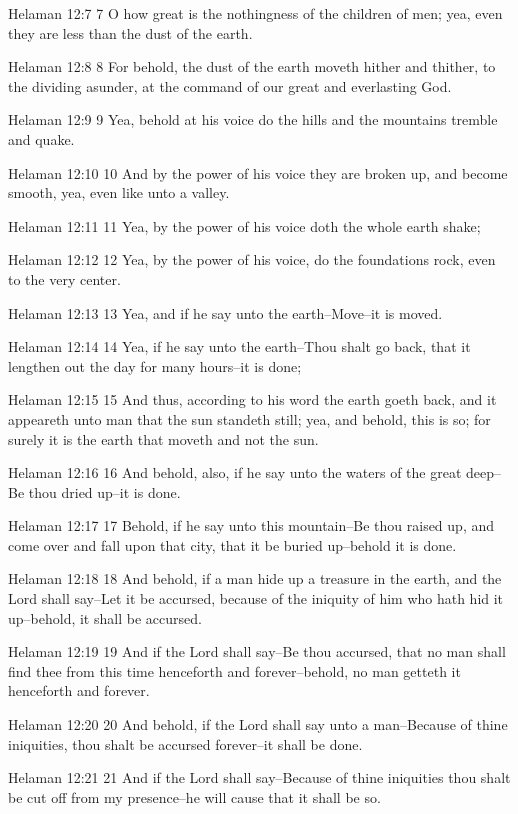 Helaman 12:7
 7 O how great is the nothingness of the children of men; yea,
even they are less than the dust of the earth.

Helaman 12:8
 8 For behold, the dust of the earth moveth hither and thither,
to the dividing asunder, at the command of our great and
everlasting God.

Helaman 12:9
 9 Yea, behold at his voice do the hills and the mountains
tremble and quake.

Helaman 12:10
 10 And by the power of his voice they are broken up, and become
smooth, yea, even like unto a valley.

Helaman 12:11
 11 Yea, by the power of his voice doth the whole earth shake;

Helaman 12:12
 12 Yea, by the power of his voice, do the foundations rock, even
to the very center.

Helaman 12:13
 13 Yea, and if he say unto the earth--Move--it is moved.

Helaman 12:14
 14 Yea, if he say unto the earth--Thou shalt go back, that it
lengthen out the day for many hours--it is done;

Helaman 12:15
 15 And thus, according to his word the earth goeth back, and it
appeareth unto man that the sun standeth still; yea, and behold,
this is so; for surely it is the earth that moveth and not the
sun.

Helaman 12:16
 16 And behold, also, if he say unto the waters of the great
deep--Be thou dried up--it is done.

Helaman 12:17
 17 Behold, if he say unto this mountain--Be thou raised up, and
come over and fall upon that city, that it be buried up--behold
it is done.

Helaman 12:18
 18 And behold, if a man hide up a treasure in the earth, and the
Lord shall say--Let it be accursed, because of the iniquity of
him who hath hid it up--behold, it shall be accursed.

Helaman 12:19
 19 And if the Lord shall say--Be thou accursed, that no man
shall find thee from this time henceforth and forever--behold, no
man getteth it henceforth and forever.

Helaman 12:20
 20 And behold, if the Lord shall say unto a man--Because of
thine iniquities, thou shalt be accursed forever--it shall be
done.

Helaman 12:21
 21 And if the Lord shall say--Because of thine iniquities thou
shalt be cut off from my presence--he will cause that it shall be
so.

